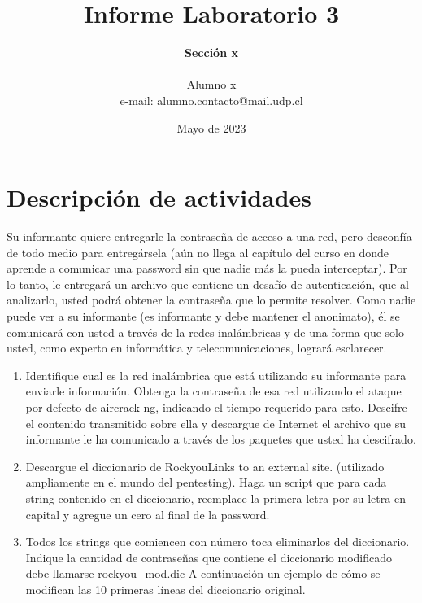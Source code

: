 \documentclass[letter,12pt]{article}
\begin{document}
%
   \title{\Huge{Informe Laboratorio 3}}

   \author{\textbf{Sección x} \\  \\Alumno x \\ e-mail: alumno.contacto@mail.udp.cl}
          
   \date{Mayo de 2023}

   \maketitle
   
   \tableofcontents
 
  \newpage
  

\section{Descripción de actividades}
Su informante quiere entregarle la contraseña de acceso a una red, pero desconfía de todo medio para entregársela (aún no llega al capítulo del curso en donde aprende a comunicar una password sin que nadie más la pueda interceptar).
Por lo tanto, le entregará un archivo que contiene un desafío de autenticación, que al analizarlo, usted podrá obtener la contraseña que lo permite resolver.
Como nadie puede ver a su informante (es informante y debe mantener el anonimato), él se comunicará con usted a través de la redes inalámbricas y de una forma que solo usted, como experto en informática y telecomunicaciones, logrará esclarecer.

\begin{enumerate}
    \item Identifique cual es la red inalámbrica que está utilizando su informante para enviarle información. Obtenga la contraseña de esa red utilizando el ataque por defecto de aircrack-ng, indicando el tiempo requerido para esto. Descifre el contenido transmitido sobre ella y descargue de Internet el archivo que su informante le ha comunicado a través de los paquetes que usted ha descifrado.
    
    \item Descargue el diccionario de RockyouLinks to an external site. (utilizado ampliamente en el mundo del pentesting). Haga un script que para cada string contenido en el diccionario, reemplace la primera letra por su letra en capital y agregue un cero al final de la password. 
    
    \item Todos los strings que comiencen con número toca eliminarlos del diccionario. Indique la cantidad de contraseñas que contiene el diccionario modificado debe llamarse rockyou\_mod.dic
    A continuación un ejemplo de cómo se modifican las 10 primeras líneas del diccionario original.

\end{enumerate}
\end{document}
